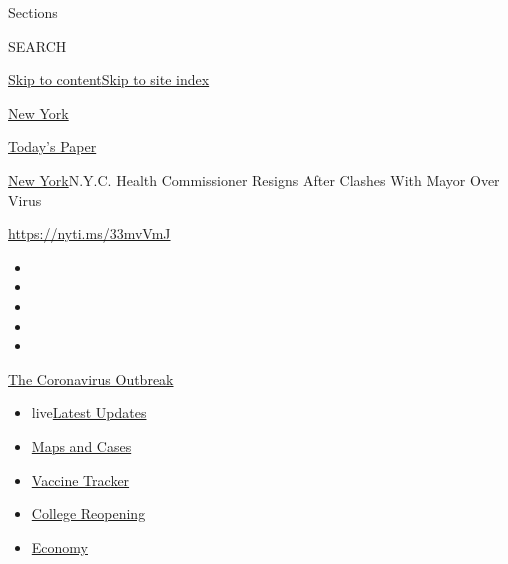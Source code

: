 Sections

SEARCH

\protect\hyperlink{site-content}{Skip to
content}\protect\hyperlink{site-index}{Skip to site index}

\href{https://www.nytimes.com/section/nyregion}{New York}

\href{https://myaccount.nytimes.com/auth/login?response_type=cookie\&client_id=vi}{}

\href{https://www.nytimes.com/section/todayspaper}{Today's Paper}

\href{/section/nyregion}{New York}\textbar{}N.Y.C. Health Commissioner
Resigns After Clashes With Mayor Over Virus

\url{https://nyti.ms/33mvVmJ}

\begin{itemize}
\item
\item
\item
\item
\item
\end{itemize}

\href{https://www.nytimes.com/news-event/coronavirus?action=click\&pgtype=Article\&state=default\&region=TOP_BANNER\&context=storylines_menu}{The
Coronavirus Outbreak}

\begin{itemize}
\tightlist
\item
  live\href{https://www.nytimes.com/2020/08/04/world/coronavirus-cases.html?action=click\&pgtype=Article\&state=default\&region=TOP_BANNER\&context=storylines_menu}{Latest
  Updates}
\item
  \href{https://www.nytimes.com/interactive/2020/us/coronavirus-us-cases.html?action=click\&pgtype=Article\&state=default\&region=TOP_BANNER\&context=storylines_menu}{Maps
  and Cases}
\item
  \href{https://www.nytimes.com/interactive/2020/science/coronavirus-vaccine-tracker.html?action=click\&pgtype=Article\&state=default\&region=TOP_BANNER\&context=storylines_menu}{Vaccine
  Tracker}
\item
  \href{https://www.nytimes.com/2020/08/02/us/covid-college-reopening.html?action=click\&pgtype=Article\&state=default\&region=TOP_BANNER\&context=storylines_menu}{College
  Reopening}
\item
  \href{https://www.nytimes.com/live/2020/08/04/business/stock-market-today-coronavirus?action=click\&pgtype=Article\&state=default\&region=TOP_BANNER\&context=storylines_menu}{Economy}
\end{itemize}

